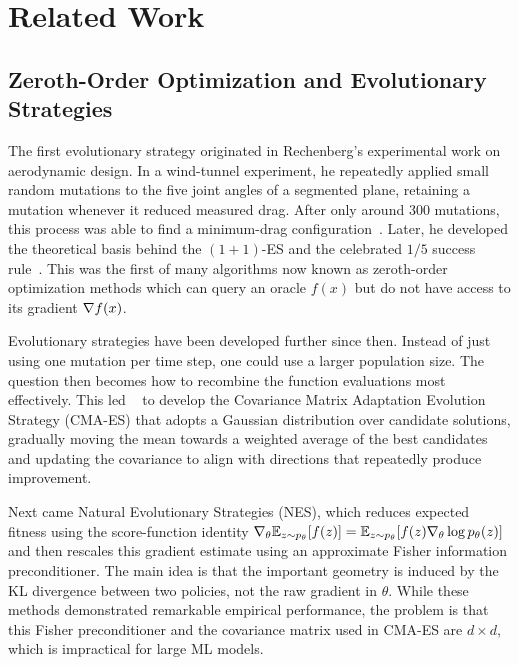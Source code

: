 \chapter[Related Work]{Related Work}
\label{chap:related-work}

\section{Zeroth-Order Optimization and Evolutionary Strategies}
The first evolutionary strategy originated in Rechenberg's experimental work on aerodynamic design. In a wind-tunnel experiment, he repeatedly applied small random mutations to the five joint angles of a segmented plane, retaining a mutation whenever it reduced measured drag. After only around 300 mutations, this process was able to find a minimum-drag configuration~\citep{rechenberg1965cybernetic}. Later, he developed the theoretical basis behind the $(1+1)$-ES and the celebrated $1/5$ success rule~\citep{rechenberg1973evolutionsstrategie}. This was the first of many algorithms now known as zeroth-order optimization methods which can query an oracle $f(x)$ but do not have access to its gradient $\nabla f(x)$.

Evolutionary strategies have been developed further since then. Instead of just using one mutation per time step, one could use a larger population size. The question then becomes how to  recombine the function evaluations most effectively. This led ~\citet{hansen2001completely} to develop the Covariance Matrix Adaptation Evolution Strategy (CMA-ES) that adopts a Gaussian distribution over candidate solutions, gradually moving the mean towards a weighted average of the best candidates and updating the covariance to align with directions that repeatedly produce improvement.

Next came Natural Evolutionary Strategies (NES), which reduces expected fitness using the score-function identity $\nabla_\theta \mathbb{E}_{z \sim p_\theta}[f(z)] = \mathbb{E}_{z \sim p_\theta}[f(z) \nabla_\theta \log p_\theta(z)]$~\citep{wierstra2014natural} and then rescales this gradient estimate using an approximate Fisher information preconditioner. The main idea is that the important geometry is induced by the KL divergence between two policies, not the raw gradient in $\theta$. While these methods demonstrated remarkable empirical performance, the problem is that this Fisher preconditioner and the covariance matrix used in CMA-ES are $d \times d$, which is impractical for large ML models.

